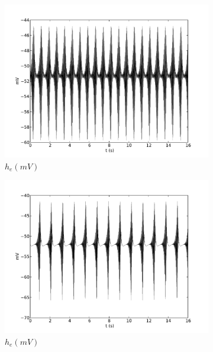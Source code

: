 \documentclass[a4paper,12pt]{article}
\begin{document}
\begin{figure}
\begin{subfigure}[b]{0.5\textwidth}
		\includegraphics[scale=0.35]{frontiers-2012-images-revised/effect_gamma_ee_yml-00493_ode-burst-psp-res_yml-mod-res-3-2-1-1_yml-he-intra.pdf}
		\caption{$h_e (mV)$}
	\end{subfigure}
	\begin{subfigure}[b]{0.5\textwidth}
		\includegraphics[scale=0.35]{frontiers-2012-images-revised/effect_gamma_ee_yml-00493_ode-burst-psp-res_yml-mod-res-3-3-1-1_yml-he-intra.pdf}
		\caption{$h_e (mV)$}
	\end{subfigure}
	\begin{subfigure}[b]{0.5\textwidth}

\end{subfigure}
\end{figure}
\end{document}
